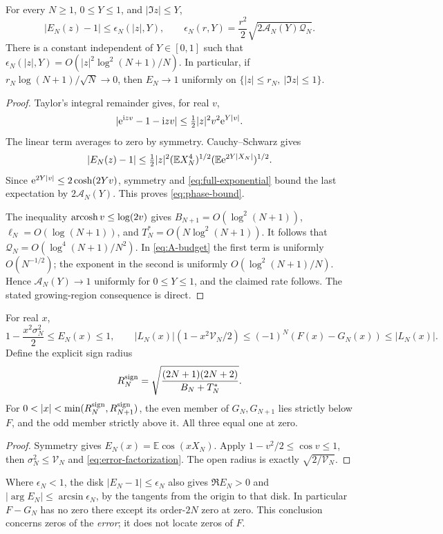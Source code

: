\begin{theorem}
\label{thm:phase}
For every \(N\ge1\), \(0\le Y\le1\), and \(|\Im z|\le Y\),
\begin{equation}
 |E_N(z)-1|\le\epsilon_N(|z|,Y),\qquad
 \epsilon_N(r,Y)=\frac{r^2}{2}
                    \sqrt{2\mathcal A_N(Y)\mathcal Q_N}.
 \label{eq:phase-bound}
\end{equation}
There is a constant independent of \(Y\in[0,1]\) such that
\(\epsilon_N(|z|,Y)=O(|z|^2\log^2(N+1)/N)\). In particular,
if \(r_N\log(N+1)/\sqrt N\to0\), then \(E_N\to1\) uniformly
on \(\{|z|\le r_N,\ |\Im z|\le1\}\).
\end{theorem}

\begin{proof}
Taylor's integral remainder gives, for real \(v\),
\[
 |\mathrm e^{\mathrm i zv}-1-\mathrm i zv|\le\tfrac12|z|^2v^2\mathrm e^{Y|v|}.
\]
The linear term averages to zero by symmetry. Cauchy--Schwarz gives
\[
 |E_N(z)-1|\le\tfrac12|z|^2
  (\mathbb E X_N^4)^{1/2}(\mathbb E\mathrm e^{2Y|X_N|})^{1/2}.
\]
Since \(\mathrm e^{2Y|v|}\le2\cosh(2Yv)\), symmetry and
\eqref{eq:full-exponential} bound the last expectation by
\(2\mathcal A_N(Y)\). This proves \eqref{eq:phase-bound}.

The inequality \(\operatorname{arcosh} v\le\log(2v)\) gives
\(B_{N+1}=O(\log^2(N+1))\), \(\ell_N=O(\log(N+1))\),
and \(T_N^*=O(N\log^2(N+1))\). It follows that
\(\mathcal Q_N=O(\log^4(N+1)/N^2)\). In \eqref{eq:A-budget}
the first term is uniformly \(O(N^{-1/2})\); the exponent in
the second is uniformly \(O(\log^2(N+1)/N)\). Hence
\(\mathcal A_N(Y)\to1\) uniformly for \(0\le Y\le1\), and the
claimed rate follows. The stated growing-region consequence is direct.
\end{proof}

\begin{corollary}
\label{cor:brackets}
For real \(x\),
\begin{equation}
 1-\frac{x^2\sigma_N^2}{2}\le E_N(x)\le1,\qquad
 |L_N(x)|(1-x^2\mathcal V_N/2)
 \le(-1)^N(F(x)-G_N(x))\le|L_N(x)|.
 \label{eq:real-sign}
\end{equation}
Define the explicit sign radius
\begin{equation}
 R_N^{\rm sign}=\sqrt{\frac{(2N+1)(2N+2)}{B_N+T_N^*}}.
 \label{eq:sign-radius}
\end{equation}
For \(0<|x|<\min(R_N^{\rm sign},R_{N+1}^{\rm sign})\), the
even member of \(G_N,G_{N+1}\) lies strictly below \(F\), and the
odd member strictly above it. All three equal one at zero.
\end{corollary}

\begin{proof}
Symmetry gives \(E_N(x)=\mathbb E\cos(xX_N)\). Apply
\(1-v^2/2\le\cos v\le1\), then
\(\sigma_N^2\le\mathcal V_N\) and
\eqref{eq:error-factorization}. The open radius is exactly
\(\sqrt{2/\mathcal V_N}\).
\end{proof}

Where \(\epsilon_N<1\), the disk \(|E_N-1|\le\epsilon_N\)
also gives \(\Re E_N>0\) and
\(|\arg E_N|\le\arcsin\epsilon_N\), by the tangents from the
origin to that disk. In particular \(F-G_N\) has no zero there
except its order-\(2N\) zero at zero. This conclusion concerns
zeros of the \emph{error}; it does not locate zeros of \(F\).
